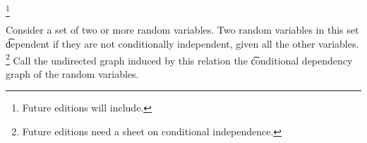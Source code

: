 
  \ifhmode\unskip\fi\footnote{
Future editions will include.
  }


Consider a set of two or more random variables.
Two random variables in this set \t{dependent} if they are not conditionally independent, given all the other variables.
  \ifhmode\unskip\fi\footnote{
Future editions need a sheet on conditional independence.
  }
Call the undirected graph induced by this relation the \t{conditional dependency graph} of the random variables.

\blankpage
